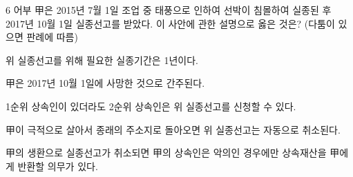 \begin{question}{6}
어부 甲은 2015년 7월 1일 조업 중 태풍으로 인하여 선박이 침몰하여 실종된 후 2017년 10월 1일 실종선고를 받았다. 이 사안에 관한 설명으로 옳은 것은? (다툼이 있으면 판례에 따름)
\begin{choices}
  \item 위 실종선고를 위해 필요한 실종기간은 1년이다.
  \item 甲은 2017년 10월 1일에 사망한 것으로 간주된다.
  \item 1순위 상속인이 있더라도 2순위 상속인은 위 실종선고를 신청할 수 있다.
  \item 甲이 극적으로 살아서 종래의 주소지로 돌아오면 위 실종선고는 자동으로 취소된다.
  \item 甲의 생환으로 실종선고가 취소되면 甲의 상속인은 악의인 경우에만 상속재산을 甲에게 반환할 의무가 있다.
\end{choices}
\end{question}
